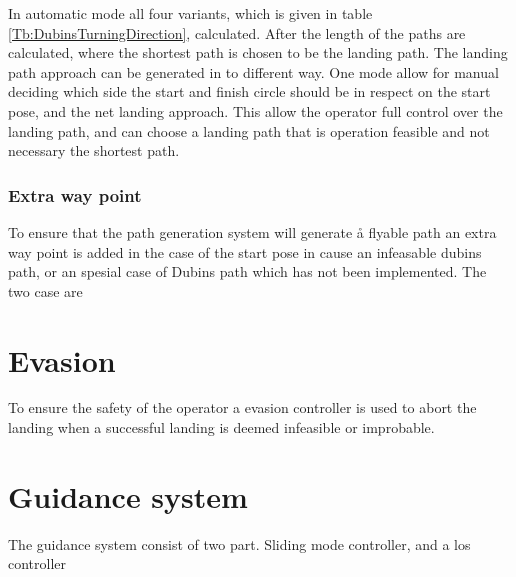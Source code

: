 In automatic mode all four variants, which is given in table \ref{Tb:DubinsTurningDirection}, calculated. After the length of the paths are calculated, where the shortest path is chosen to be the landing path.
The landing path approach can be generated in to different way. One mode allow for manual deciding which side the start and finish circle should be in respect on the start pose, and the net landing approach. This allow the operator full control over the landing path, and can choose a landing path that is operation feasible and not necessary the shortest path. 
\subsubsection{Extra way point}
To ensure that the path generation system will generate å flyable path an extra way point is added in the case of the start pose in cause an infeasable dubins path, or an spesial case of Dubins path which has not been implemented. The two case are
\begin{subequations}
\end{subequations}
\section{Evasion}
To ensure the safety of the operator a evasion controller is used to abort the landing when a successful landing is deemed infeasible or improbable.

\section{Guidance system}
The guidance system consist of two part. Sliding mode controller, and a los controller

